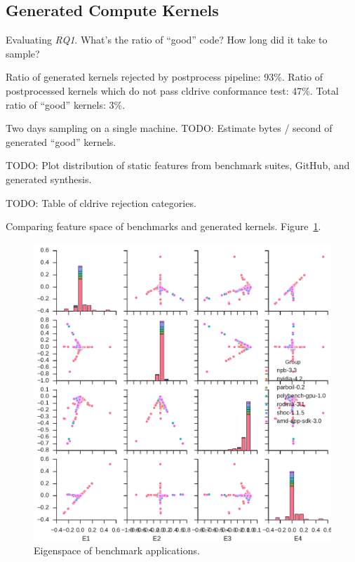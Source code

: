 \documentclass[preprint,nonatbib,10pt,nocopyrightspace]{sigplanconf}
\begin{document}
\subsection{Generated Compute Kernels}\label{subsec:}

Evaluating \emph{RQ1}. What's the ratio of ``good'' code? How long did
it take to sample?

Ratio of generated kernels rejected by postprocess pipeline:
93\%. Ratio of postprocessed kernels which do not pass cldrive
conformance test:
47\%. Total ratio of ``good'' kernels: 3\%.

Two days sampling on a single machine. TODO: Estimate bytes / second
of generated ``good'' kernels.

TODO: Plot distribution of static features from benchmark suites,
GitHub, and generated synthesis.

TODO: Table of cldrive rejection categories.

Comparing feature space of benchmarks and generated
kernels. Figure~\ref{fig:bench-eigens}.

\begin{figure}%
  \includegraphics[width=\columnwidth]{img/bench-eigens}%
  \caption{%
    Eigenspace of benchmark applications.%
  }
  \label{fig:bench-eigens}
\end{figure}
\end{document}
